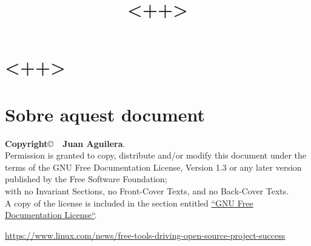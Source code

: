 \documentclass[a4paper]{article}
\begin{document}
\title{<++>}
\maketitle


%

\begin{comment}
oddsidemargin \the\oddsidemargin \newline
textwidth \the\textwidth \newline
marginparsep \the\marginparsep \newline
marginparwidth \the\marginparwidth \newline
hoffset \the\hoffset \newline
paperwidth \the\paperwidth 
\end{comment}

\section{<++>}


\section{Sobre aquest document}
\textbf{Copyright}\copyright\ \textbf{\the\year\ Juan Aguilera}.\\
Permission is granted to copy, distribute and/or modify this document under the terms of the GNU Free Documentation License, Version 1.3 or any later version published by the Free Software Foundation;\\
with no Invariant Sections, no Front-Cover Texts, and no Back-Cover Texts.\\
A copy of the license is included in the section entitled \href{http://www.gnu.org/licenses/fdl.html}{``GNU Free Documentation License``}.

\begin{thebibliography}{99}
	 \url{https://www.linux.com/news/free-tools-driving-open-source-project-success}

\end{thebibliography}
\end{document}
